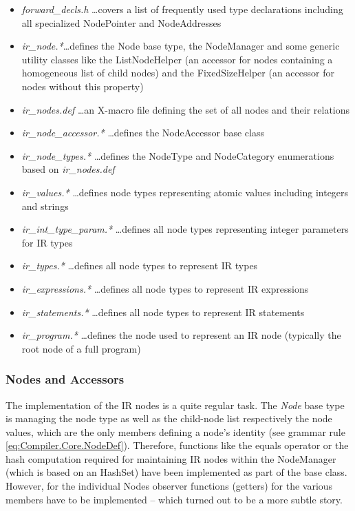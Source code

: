 \begin{itemize}
  \item \textit{forward\_decls.h} \ldots covers a list of frequently used type
  declarations including all specialized NodePointer and NodeAddresses
  \item \textit{ir\_node.*}\ldots defines the Node base type, the NodeManager
  and some generic utility classes like the ListNodeHelper (an accessor for
  nodes containing a homogeneous list of child nodes) and the FixedSizeHelper
  (an accessor for nodes without this property)
  \item \textit{ir\_nodes.def} \ldots an X-macro file defining the set of all
  nodes and their relations
  \item \textit{ir\_node\_accessor.*} \dots defines the NodeAccessor base class
  \item \textit{ir\_node\_types.*} \ldots defines the NodeType and NodeCategory
  enumerations based on \textit{ir\_nodes.def}
  \item \textit{ir\_values.*} \dots defines node types representing atomic
  values including integers and strings
  \item \textit{ir\_int\_type\_param.*} \ldots defines all node types
  representing integer parameters for IR types
  \item \textit{ir\_types.*} \ldots defines all node types to represent IR types
  \item \textit{ir\_expressions.*} \ldots defines all node types to represent IR
  expressions
  \item \textit{ir\_statements.*} \ldots defines all node types to represent IR
  statements
  \item \textit{ir\_program.*} \ldots defines the node used to represent an IR
  node (typically the root node of a full program)
\end{itemize}


\subsubsection{Nodes and Accessors} 
The implementation of the IR nodes is a quite regular task. The \textit{Node}
base type is managing the node type as well as the child-node list respectively
the node values, which are the only members defining a node's identity (see
grammar rule \ref{eq:Compiler.Core.NodeDef}). Therefore, functions like the
equals operator or the hash computation required for maintaining IR nodes
within the NodeManager (which is based on an HashSet) have been implemented
as part of the base class. However, for the individual Nodes observer functions
(getters) for the various members have to be implemented -- which turned out to
be a more subtle story.


